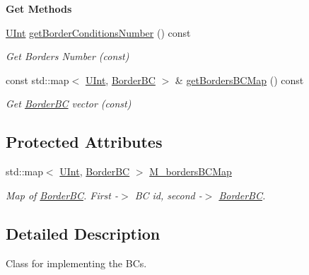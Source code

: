 \begin{Indent}{\bf Get Methods}\par
\begin{DoxyCompactItemize}
\item 
\hyperlink{namespaceFVCode3D_a4bf7e328c75d0fd504050d040ebe9eda}{U\+Int} \hyperlink{classFVCode3D_1_1BoundaryConditions_a6afde21eb7dbb56bc7e90bae87c12300}{get\+Border\+Conditions\+Number} () const 
\begin{DoxyCompactList}\small\item\em Get Borders Number (const) \end{DoxyCompactList}\item 
const std\+::map$<$ \hyperlink{namespaceFVCode3D_a4bf7e328c75d0fd504050d040ebe9eda}{U\+Int}, \hyperlink{classFVCode3D_1_1BoundaryConditions_1_1BorderBC}{Border\+BC} $>$ \& \hyperlink{classFVCode3D_1_1BoundaryConditions_a5b53a81bdab88709fae14892bfe6a7c9}{get\+Borders\+B\+C\+Map} () const 
\begin{DoxyCompactList}\small\item\em Get \hyperlink{classFVCode3D_1_1BoundaryConditions_1_1BorderBC}{Border\+BC} vector (const) \end{DoxyCompactList}\end{DoxyCompactItemize}
\end{Indent}
\subsection*{Protected Attributes}
\begin{DoxyCompactItemize}
\item 
std\+::map$<$ \hyperlink{namespaceFVCode3D_a4bf7e328c75d0fd504050d040ebe9eda}{U\+Int}, \hyperlink{classFVCode3D_1_1BoundaryConditions_1_1BorderBC}{Border\+BC} $>$ \hyperlink{classFVCode3D_1_1BoundaryConditions_a22895d7e9ca19c8eb4a5ee34d2ad8b17}{M\+\_\+borders\+B\+C\+Map}
\begin{DoxyCompactList}\small\item\em Map of \hyperlink{classFVCode3D_1_1BoundaryConditions_1_1BorderBC}{Border\+BC}. First -\/$>$ BC id, second -\/$>$ \hyperlink{classFVCode3D_1_1BoundaryConditions_1_1BorderBC}{Border\+BC}. \end{DoxyCompactList}\end{DoxyCompactItemize}


\subsection{Detailed Description}
Class for implementing the B\+Cs. 

